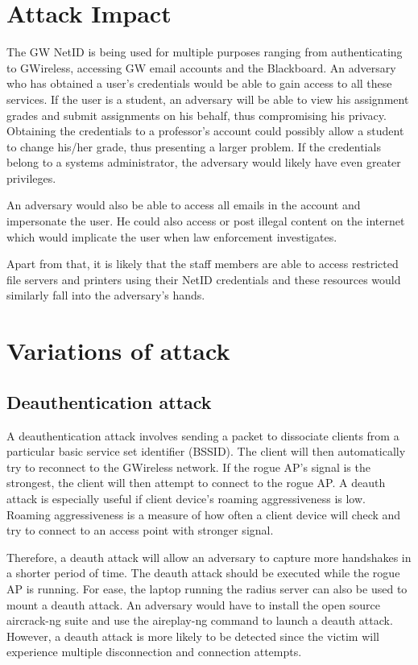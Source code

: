 \documentclass[twoside]{article}
\begin{document}
\begin{multicols}{2}
\section{Attack Impact}

The GW NetID is being used for multiple purposes ranging from authenticating to GWireless, accessing GW email accounts and the Blackboard. An adversary who has obtained a user's credentials would be able to gain access to all these services. If the user is a student, an adversary will be able to view his assignment grades and submit assignments on his behalf, thus compromising his privacy. Obtaining the credentials to a professor's account could possibly allow a student to change his/her grade, thus presenting a larger problem. If the credentials belong to a systems administrator, the adversary would likely have even greater privileges.

An adversary would also be able to access all emails in the account and impersonate the user. He could also access or post illegal content on the internet which would implicate the user when law enforcement investigates.

Apart from that, it is likely that the staff members are able to access restricted file servers and printers using their NetID credentials and these resources would similarly fall into the adversary's hands.

\section{Variations of attack}

\subsection{Deauthentication attack}

A deauthentication attack involves sending a packet to dissociate clients from a particular basic service set identifier (BSSID). The client will then automatically try to reconnect to the GWireless network. If the rogue AP's signal is the strongest, the client will then attempt to connect to the rogue AP.  A deauth attack is especially useful if client device's roaming aggressiveness is low. Roaming aggressiveness is a measure of how often a client device will check and try to connect to an access point with stronger signal.

Therefore, a deauth attack will allow an adversary to capture more handshakes in a shorter period of time. The deauth attack should be executed while the rogue AP is running. For ease, the laptop running the radius server can also be used to mount a deauth attack. An adversary would have to install the open source aircrack-ng\cite{7} suite and use the aireplay-ng command to launch a deauth attack. However, a deauth attack is more likely to be detected since the victim will experience multiple disconnection and connection attempts.


\end{multicols}
\end{document}
